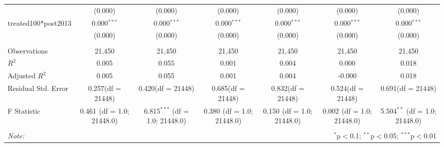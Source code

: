 \documentclass[12pt]{article}
\begin{document}
\begin{table}[!htbp]
\begin{tabular}{@{\extracolsep{5pt}}lcccccc}
  & (0.000) & (0.000) & (0.000) & (0.000) & (0.000) & (0.000) \\
 treated100*post2013 & 0.000$^{***}$ & 0.000$^{***}$ & 0.000$^{***}$ & 0.000$^{***}$ & 0.000$^{***}$ & 0.000$^{***}$ \\
  & (0.000) & (0.000) & (0.000) & (0.000) & (0.000) & (0.000) \\
\hline \\[-1.8ex]
 Observations & 21,450 & 21,450 & 21,450 & 21,450 & 21,450 & 21,450 \\
 $R^2$ & 0.005 & 0.055 & 0.001 & 0.004 & 0.000 & 0.018 \\
 Adjusted $R^2$ & 0.005 & 0.055 & 0.001 & 0.004 & -0.000 & 0.018 \\
 Residual Std. Error & 0.257(df = 21448) & 0.420(df = 21448) & 0.685(df = 21448) & 0.832(df = 21448) & 0.524(df = 21448) & 0.691(df = 21448)  \\
 F Statistic & 0.461$^{}$ (df = 1.0; 21448.0) & 6.815$^{***}$ (df = 1.0; 21448.0) & 0.380$^{}$ (df = 1.0; 21448.0) & 0.150$^{}$ (df = 1.0; 21448.0) & 0.002$^{}$ (df = 1.0; 21448.0) & 5.504$^{**}$ (df = 1.0; 21448.0) \\
\hline
\hline \\[-1.8ex]
\textit{Note:} & \multicolumn{6}{r}{$^{*}$p$<$0.1; $^{**}$p$<$0.05; $^{***}$p$<$0.01} \\
\end{tabular}
\end{table}
\end{document}
